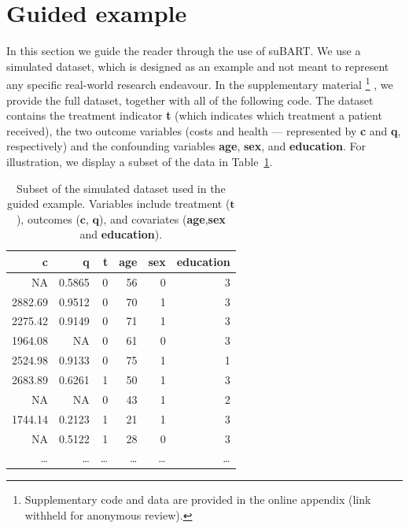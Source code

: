 \documentclass[aoas,preprint]{imsart}
\theoremstyle{plain}
\theoremstyle{definition}
\theoremstyle{remark}
\theoremstyle{remark}
\begin{document}
\section{Guided example}
In this section we guide the reader through the use of suBART. We use a simulated dataset, which is designed as an example and not meant to represent any specific real-world research endeavour. In the supplementary material
\footnote{Supplementary code and data are provided in the online appendix (link withheld for anonymous review).}
, we provide the full dataset, together with all of the following code.
The dataset contains the treatment indicator \textbf{t} (which indicates which treatment a patient received), the two outcome variables (costs and health --- represented by \textbf{c} and \textbf{q}, respectively) and the confounding variables \textbf{age}, \textbf{sex}, and \textbf{education}. For illustration, we display a subset of the data in Table~\ref{tab:data}.

\begin{table}[ht]
\caption{Subset of the simulated dataset used in the guided example. Variables include treatment ($\mathbf{t}$), outcomes ($\mathbf{c}$, $\mathbf{q}$), and covariates (\textbf{age},\textbf{sex} and \textbf{education}).}
\label{tab:data}
\centering
\begin{tabular}{rrrrrr}
\hline
\textbf{c} & \textbf{q} & \textbf{t} & \textbf{age} & \textbf{sex} & \textbf{education} \\
\hline
NA & 0.5865 & 0 & 56 & 0 & 3 \\
2882.69 & 0.9512 & 0 & 70 & 1 & 3 \\
2275.42 & 0.9149 & 0 & 71 & 1 & 3 \\
1964.08 & NA & 0 & 61 & 0 & 3 \\
2524.98 & 0.9133 & 0 & 75 & 1 & 1 \\
2683.89 & 0.6261 & 1 & 50 & 1 & 3 \\
NA & NA & 0 & 43 & 1 & 2 \\
1744.14 & 0.2123 & 1 & 21 & 1 & 3 \\
NA & 0.5122 & 1 & 28 & 0 & 3 \\
\ldots & \ldots & \ldots & \ldots & \ldots & \ldots \\
\hline
\end{tabular}
\end{table}
\end{document}
